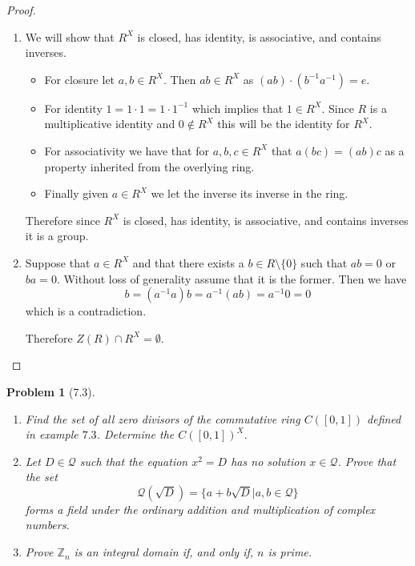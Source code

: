 \documentclass[10pt]{article}
\newcommand{\sk}{\vskip 10mm}
\newcommand{\bb}[1]{\mathbb{#1}}
\theoremstyle{plain}
\newtheorem{problem}{Problem}
\theoremstyle{remark}
\begin{document}
\begin{proof}
  \begin{enumerate}
  \item We will show that $R^X$ is closed, has identity, is associative, and
    contains inverses.
    \begin{itemize}
    \item For closure let $a,b\in R^X$. Then $ab\in R^X$ as $(ab)\cdot(b^{-1}a^{-1})=e$.
    \item For identity $1=1\cdot 1=1\cdot 1^{-1}$ which implies that $1\in R^X$. Since
      $R$ is a multiplicative identity and $0\notin R^X$ this will be the identity
      for $R^X$.
    \item For associativity we have that for $a,b,c\in R^X$ that $a(bc)=(ab)c$
      as a property inherited from the overlying ring.
    \item Finally given $a\in R^X$ we let the inverse  its inverse in the ring.
    \end{itemize}
    Therefore since $R^X$ is closed, has identity, is associative, and contains
    inverses it is a group.
  \item Suppose that $a\in R^X$ and that there exists a $b\in R\setminus\{0\}$ such that
    $ab=0$ or $ba=0$. Without loss of generality assume that it is the
    former. Then we have
    \[ b=(a^{-1}a)b=a^{-1}(ab)=a^{-1}0=0\]
    which is a contradiction.

    Therefore $Z(R)\cap R^X=\emptyset$.
  \end{enumerate}
\end{proof}

\sk

\begin{problem}[7.3]
  \begin{enumerate}
  \item Find the set of all zero divisors of the commutative ring $C([0,1])$
    defined in example $7.3$. Determine the $C([0,1])^X$.
  \item Let $D\in\mathcal{Q}$ such that the equation $x^2=D$ has no solution
    $x\in\mathcal{Q}$. Prove that the set
    \[ \mathcal{Q}(\sqrt{D})=\{a+b\sqrt{D}|a,b\in\mathcal{Q}\}\]
    forms a field under the ordinary addition and multiplication of
    complex numbers.
   \item Prove $\bb{Z}_n$ is an integral domain if, and only if, $n$ is prime.
  \end{enumerate}
\end{problem}
\end{document}
